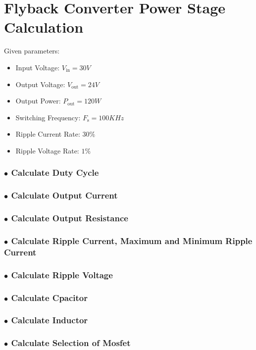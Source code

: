 \documentclass{article}
\begin{document}
\section*{Flyback Converter Power Stage Calculation}

Given parameters:
\begin{itemize}
    \item Input Voltage: \( V_{\text{in}} =  30V\)
    \item Output Voltage: \(V_{\text{out}} = 24V\)
    \item Output Power: \(P_{\text{out}} = 120W\)
    \item Switching Frequency: \(F_\text{s} = 100KHz\)
    \item Ripple Current Rate: \(30\%\)
    \item Ripple Voltage Rate: \(1\%\)
\end{itemize}
\subsubsection*{$\bullet$ Calculate Duty Cycle}
\subsubsection*{$\bullet$ Calculate Output Current}
\subsubsection*{$\bullet$ Calculate Output Resistance}
\subsubsection*{$\bullet$ Calculate Ripple Current, Maximum and Minimum Ripple Current }
\subsubsection*{$\bullet$ Calculate Ripple Voltage}
\subsubsection*{$\bullet$ Calculate Cpacitor}
\subsubsection*{$\bullet$ Calculate Inductor}
\subsubsection*{$\bullet$ Calculate Selection of Mosfet}
\end{document}
